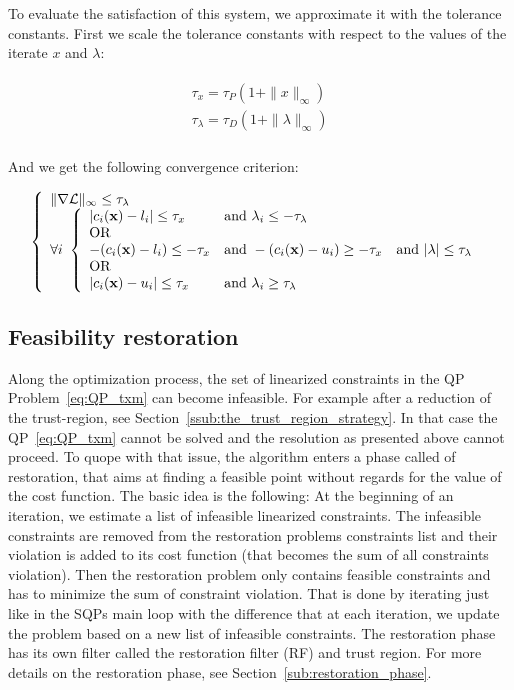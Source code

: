 To evaluate the satisfaction of this system, we approximate it with the tolerance constants.
First we scale the tolerance constants with respect to the values of the iterate $x$ and $\lambda$:

\begin{align}
\begin{split}
  \tau_x = \tau_P(1+\|x\|_\infty)\\
  \tau_\lambda =\tau_D(1+\|\lambda\|_\infty)\\
\end{split}
\end{align}

And we get the following convergence criterion:

\begin{equation}
\label{KKTfinal}
\left\{
\begin{array}{lr}
  \|\nabla \mathcal{L}\|_\infty \leq \tau_\lambda \\
  \forall i\
  \left\{
  \begin{array}{lll}
  |c_i({\bf x}) - l_i| \leq \tau_x & \text{and } \lambda_i \leq -\tau_\lambda\\
  \text{OR}\\
  -(c_i({\bf x}) - l_i) \leq -\tau_x &\text{and } -(c_i({\bf x}) - u_i) \geq -\tau_x & \text{and } |\lambda| \leq \tau_\lambda \\
  \text{OR}\\
  |c_i({\bf x}) - u_i| \leq \tau_x & \text{and } \lambda_i \geq \tau_\lambda\\
  \end{array}
  \right.
\end{array}
\right.
\end{equation}

\subsection{Feasibility restoration}
\label{sub:feasibility_restoration}

Along the optimization process, the set of linearized constraints in the QP Problem~\ref{eq:QP_txm} can become infeasible.
For example after a reduction of the trust-region, see Section~\ref{ssub:the_trust_region_strategy}.
In that case the QP~\ref{eq:QP_txm} cannot be solved and the resolution as presented above cannot proceed.
To quope with that issue, the algorithm enters a phase called of restoration, that aims at finding a feasible point without regards for the value of the cost function.
The basic idea is the following: At the beginning of an iteration, we estimate a list of infeasible linearized constraints.
The infeasible constraints are removed from the restoration problems constraints list and their violation is added to its cost function (that becomes the sum of all constraints violation).
Then the restoration problem only contains feasible constraints and has to minimize the sum of constraint violation.
That is done by iterating just like in the SQPs main loop with the difference that at each iteration, we update the problem based on a new list of infeasible constraints.
The restoration phase has its own filter called the restoration filter (RF) and trust region.
For more details on the restoration phase, see Section~\ref{sub:restoration_phase}.

